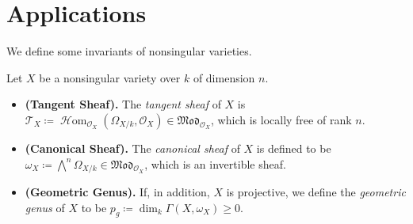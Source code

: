 \documentclass[11pt,a4paper,footinclude=true,headinclude=true]{scrbook} %
\newcommand{\OO}{\mathcal{O}}
\newcommand{\TT}{\mathcal{T}}
\newcommand{\<}{\langle}
\newcommand{\>}{\rangle}
\DeclareMathOperator{\HHom}{\mathscr{H}om}
\newcommand{\MOD}{\mathfrak{Mod}}
\newenvironment{definition*}[2][Definition]
    { \begin{mdframed}[backgroundcolor=blue!20] \textbf{#1.}\ }
    {  \end{mdframed}}
\begin{document}
\newpage
\section{Applications}

We define some invariants of nonsingular varieties.

\begin{definition*}{}
    Let $X$ be a nonsingular variety over $k$ of dimension $n$.
    \begin{itemize}
        \item \textbf{(Tangent Sheaf).} The \textit{tangent sheaf} of $X$ is %
        $\TT_X\coloneqq\HHom_{\OO_X}(\Omega_{X/k},\OO_X)\in\MOD_{\OO_X}$, which is locally free of rank $n$.
        \item \textbf{(Canonical Sheaf).} The \textit{canonical sheaf} of $X$ is defined to be $\omega_X\coloneqq\bigwedge^n\Omega_{X/k}\in\MOD_{\OO_X}$, which is an invertible sheaf.
        \item \textbf{(Geometric Genus).} If, in addition, $X$ is projective, we define the \textit{geometric genus} of $X$ to be $p_g\coloneqq\dim_k\Gamma(X,\omega_X)\geq0$.
    \end{itemize}
\end{definition*}
\end{document}
